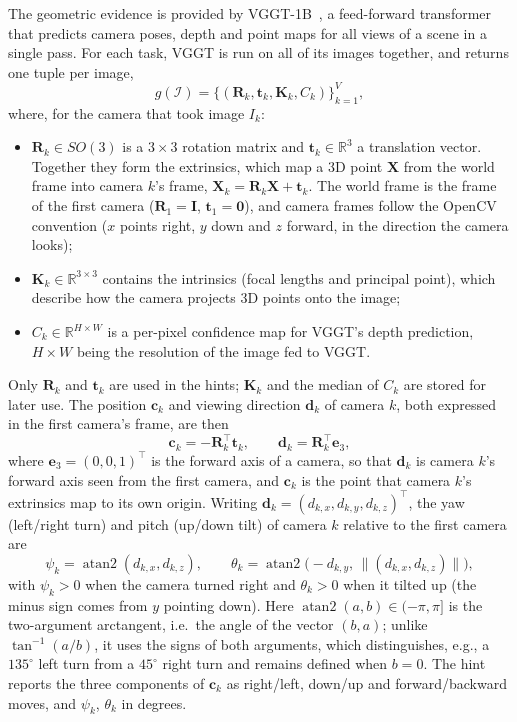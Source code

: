The geometric evidence is provided by VGGT-1B~\citep{wang2025vggt}, a feed-forward transformer that predicts camera poses, depth and point maps for all views of a scene in a single pass. For each task, VGGT is run on all of its images together, and returns one tuple per image,
\begin{equation}
g(\mathcal{I})=\{(\mathbf{R}_k,\mathbf{t}_k,\mathbf{K}_k,C_k)\}_{k=1}^{V},
\end{equation}
where, for the camera that took image $I_k$:
\begin{itemize}\itemsep0pt
\item $\mathbf{R}_k\in SO(3)$ is a $3\times3$ rotation matrix and $\mathbf{t}_k\in\mathbb{R}^3$ a translation vector. Together they form the extrinsics, which map a 3D point $\mathbf{X}$ from the world frame into camera $k$'s frame, $\mathbf{X}_k=\mathbf{R}_k\mathbf{X}+\mathbf{t}_k$. The world frame is the frame of the first camera ($\mathbf{R}_1=\mathbf{I}$, $\mathbf{t}_1=\mathbf{0}$), and camera frames follow the OpenCV convention ($x$ points right, $y$ down and $z$ forward, in the direction the camera looks);
\item $\mathbf{K}_k\in\mathbb{R}^{3\times3}$ contains the intrinsics (focal lengths and principal point), which describe how the camera projects 3D points onto the image;
\item $C_k\in\mathbb{R}^{H\times W}$ is a per-pixel confidence map for VGGT's depth prediction, $H\times W$ being the resolution of the image fed to VGGT.
\end{itemize}
Only $\mathbf{R}_k$ and $\mathbf{t}_k$ are used in the hints; $\mathbf{K}_k$ and the median of $C_k$ are stored for later use. The position $\mathbf{c}_k$ and viewing direction $\mathbf{d}_k$ of camera $k$, both expressed in the first camera's frame, are then
\begin{equation}
\mathbf{c}_k=-\mathbf{R}_k^{\top}\mathbf{t}_k,\qquad
\mathbf{d}_k=\mathbf{R}_k^{\top}\mathbf{e}_3,
\end{equation}
where $\mathbf{e}_3=(0,0,1)^{\top}$ is the forward axis of a camera, so that $\mathbf{d}_k$ is camera $k$'s forward axis seen from the first camera, and $\mathbf{c}_k$ is the point that camera $k$'s extrinsics map to its own origin. Writing $\mathbf{d}_k=(d_{k,x},d_{k,y},d_{k,z})^{\top}$, the yaw (left/right turn) and pitch (up/down tilt) of camera $k$ relative to the first camera are
\begin{equation}
\psi_k=\operatorname{atan2}(d_{k,x},d_{k,z}),\qquad
\theta_k=\operatorname{atan2}\!\big(-d_{k,y},\,\|(d_{k,x},d_{k,z})\|\big),
\end{equation}
with $\psi_k>0$ when the camera turned right and $\theta_k>0$ when it tilted up (the minus sign comes from $y$ pointing down). Here $\operatorname{atan2}(a,b)\in(-\pi,\pi]$ is the two-argument arctangent, i.e.\ the angle of the vector $(b,a)$; unlike $\tan^{-1}(a/b)$, it uses the signs of both arguments, which distinguishes, e.g., a $135^\circ$ left turn from a $45^\circ$ right turn and remains defined when $b=0$. The hint reports the three components of $\mathbf{c}_k$ as right/left, down/up and forward/backward moves, and $\psi_k$, $\theta_k$ in degrees.

